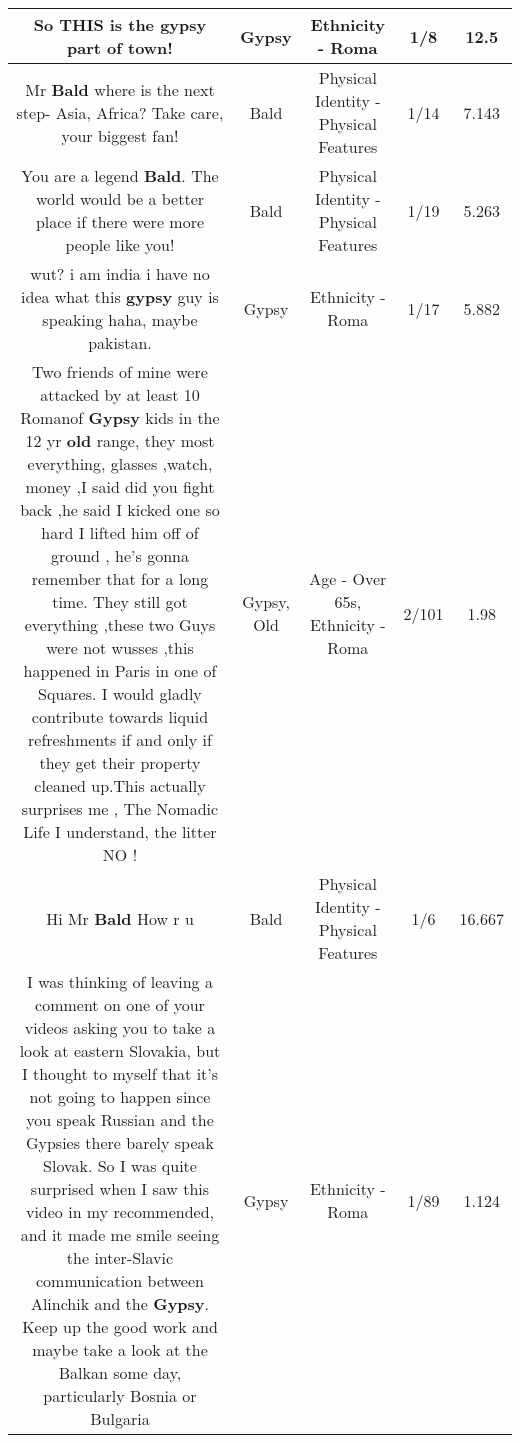 \documentclass[11pt]{article}
\newlength\mylength
\begin{document}
\begin{center}
\begin{longtable}{|C{.65\mylength}|C{.30\mylength}|C{.12\mylength}|C{.12\mylength}|C{.12\mylength}|}
  \small So THIS is the \textbf{gypsy} part of town!\normalsize   & Gypsy & Ethnicity - Roma & 1/8 & 12.5 \\  \hline
  \small Mr \textbf{Bald} where is the next step- Asia, Africa?  Take care, your biggest fan!\normalsize   & Bald & Physical Identity - Physical Features & 1/14 & 7.143 \\  \hline
  \small You are a legend \textbf{Bald}. The world would be a better place if there were more people like you!\normalsize   & Bald & Physical Identity - Physical Features & 1/19 & 5.263 \\  \hline
  \small wut? i am india i have no idea what this \textbf{gypsy} guy is speaking haha, maybe pakistan.\normalsize   & Gypsy & Ethnicity - Roma & 1/17 & 5.882 \\  \hline
  \small Two friends of mine were attacked by at least 10 Romanof \textbf{Gypsy} kids in the 12 yr \textbf{old} range, they most everything, glasses ,watch, money ,I said did you fight back ,he said I kicked one so hard I lifted him off of ground , he's gonna remember that for a long time. They still got everything ,these two Guys were not wusses ,this happened in Paris in one of Squares. I would gladly contribute towards liquid refreshments if and only if they get their property cleaned up.This actually surprises me , The Nomadic Life I understand,  the litter   NO !\normalsize   & Gypsy, Old & Age - Over 65s, Ethnicity - Roma & 2/101 & 1.98 \\  \hline
  \small Hi Mr \textbf{Bald}  How r u\normalsize   & Bald & Physical Identity - Physical Features & 1/6 & 16.667 \\  \hline
  \small I was thinking of leaving a comment on one of your videos asking you to take a look at eastern Slovakia, but I thought to myself that it's not going to happen since you speak Russian and the Gypsies there barely speak Slovak. So I was quite surprised when I saw this video in my recommended, and it made me smile seeing the inter-Slavic communication between Alinchik and the \textbf{Gypsy}. Keep up the good work and maybe take a look at the Balkan some day, particularly Bosnia or Bulgaria\normalsize   & Gypsy & Ethnicity - Roma & 1/89 & 1.124 \\  \hline

\end{longtable}
\end{center}
\end{document}

